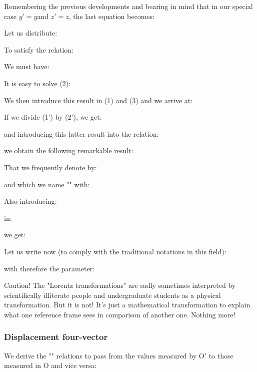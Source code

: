 	Remembering the previous developments and bearing in mind that in our special case $y '= y $and $z' = z$, the last equation becomes:
	
	Let us distribute:
	
	To satisfy the relation:
	
	We must have:
	
	It is easy to solve (2):
	
	We then introduce this result in (1) and (3) and we arrive at:
	
	If we divide (1') by (2'), we get:
	
	and introducing this latter result into the relation:
	
	we obtain the following remarkable result:
	
	That we frequently denote by:
	
	and which we name "\label{michelson morley factor}" with:
	
	Also introducing:
	
	in:
	
	we get:
	
	Let us write now (to comply with the traditional notations in this field):
	
	with therefore the parameter:
	
	
	\begin{tcolorbox}[colback=red!5,borderline={1mm}{2mm}{red!5},arc=0mm,boxrule=0pt]
	\bcbombe Caution! The "Lorentz transformations" are sadly sometimes interpreted by scientifically illiterate people and undergraduate students as a physical transformation. But it is not! It's just a mathematical transformation to explain what one reference frame sees in comparison of another one. Nothing more!
	\end{tcolorbox}

	\subsubsection{Displacement four-vector}
	We derive the "" relations to pass from the values measured by $\text{O}'$ to those measured in $\text{O}$ and vice versa:
	
